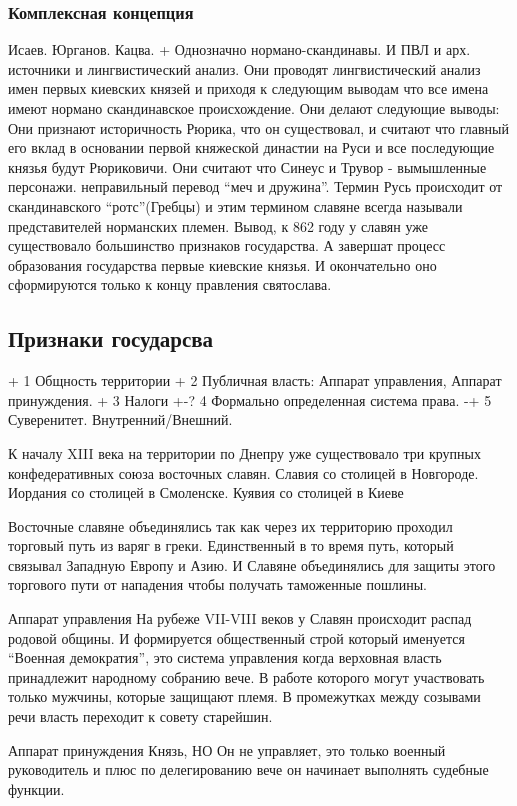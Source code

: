 \documentclass[a4paper]{article}
\begin{document}
\subsubsection{Комплексная концепция}
    Исаев. Юрганов. Кацва. 
    + Однозначно нормано-скандинавы. И ПВЛ и арх. источники и лингвистический анализ. Они проводят лингвистический анализ имен первых киевских князей и приходя к следующим выводам что все имена имеют нормано скандинавское происхождение. Они делают следующие выводы:
        Они признают историчность Рюрика, что он существовал, и считают что главный его вклад в основании первой княжеской династии на Руси и все последующие князья будут Рюриковичи. Они считают что Синеус и Трувор - вымышленные персонажи. неправильный перевод ``меч и дружина''.
    Термин Русь происходит от скандинавского ``ротс''(Гребцы) и этим термином славяне всегда называли представителей норманских племен.
    Вывод, к 862 году у славян уже существовало большинство признаков государства. А завершат процесс образования государства первые киевские князья. И окончательно оно сформируются только к концу правления святослава.
\subsection{Признаки государсва}
+ 1 Общность территории
+ 2 Публичная власть: Аппарат управления, Аппарат принуждения.
+ 3 Налоги
+-? 4 Формально определенная система права.
-+ 5 Суверенитет. Внутренний/Внешний.

К началу XIII века на территории по Днепру уже существовало три крупных конфедеративных союза восточных славян. 
    Славия со столицей в Новгороде. 
    Иордания со столицей в Смоленске. 
    Куявия со столицей в Киеве

Восточные славяне объединялись так как через их территорию проходил торговый путь из варяг в греки. Единственный в то время путь, который связывал Западную Европу и Азию. И Славяне объединялись для защиты этого торгового пути от нападения чтобы получать таможенные пошлины.

Аппарат управления
На рубеже VII-VIII веков у Славян происходит распад родовой общины. И формируется общественный строй который именуется ``Военная демократия'', это система управления когда верховная власть принадлежит народному собранию вече. В работе которого могут участвовать только мужчины, которые защищают племя. В промежутках между созывами речи власть переходит к совету старейшин.

Аппарат принуждения
Князь, НО Он не управляет, это только военный руководитель и плюс по делегированию вече он начинает выполнять судебные функции.
\end{document}
